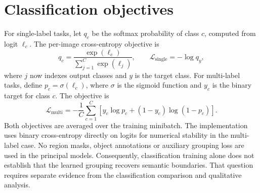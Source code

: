 \section{Classification objectives}

For single-label tasks, let $q_c$ be the softmax probability of class $c$,
computed from logit $\ell_c$. The per-image cross-entropy objective is
\begin{equation}
 q_c=\frac{\exp(\ell_c)}{\sum_{j=1}^{C}\exp(\ell_j)},
 \qquad \mathcal{L}_{\mathrm{single}}=-\log q_y,
 \label{eq:single-loss}
\end{equation}
where $j$ now indexes output classes and $y$ is the target class.
For multi-label tasks, define $p_c=\sigma(\ell_c)$, where $\sigma$ is the
sigmoid function and $y_c$ is the binary target for class $c$. The objective is
\begin{equation}
 \mathcal{L}_{\mathrm{multi}}=-\frac{1}{C}\sum_{c=1}^{C}
 \left[y_c\log p_c+(1-y_c)\log(1-p_c)\right].
 \label{eq:multi-loss}
\end{equation}
Both objectives are averaged over the training minibatch. The implementation
uses binary cross-entropy directly on logits for numerical stability in the
multi-label case. No region masks, object annotations or auxiliary grouping
loss are used in the principal models. Consequently, classification training
alone does not establish that the learned grouping recovers semantic
boundaries. That question requires separate evidence from the classification
comparison and qualitative analysis.

